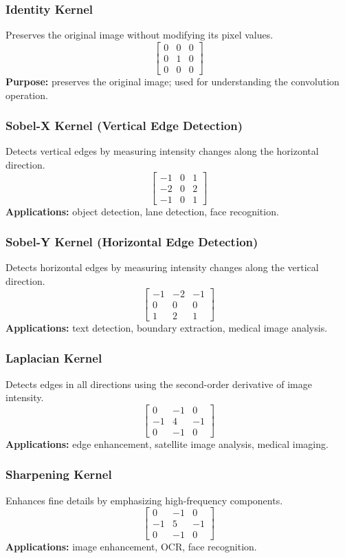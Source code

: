 \documentclass[11pt]{article}
\begin{document}
\subsubsection*{Identity Kernel}
Preserves the original image without modifying its pixel values.
\[
\begin{bmatrix}
0 & 0 & 0\\
0 & 1 & 0\\
0 & 0 & 0
\end{bmatrix}
\]
\textbf{Purpose:} preserves the original image; used for understanding the convolution operation.

\subsubsection*{Sobel-X Kernel (Vertical Edge Detection)}
Detects vertical edges by measuring intensity changes along the horizontal direction.
\[
\begin{bmatrix}
-1 & 0 & 1\\
-2 & 0 & 2\\
-1 & 0 & 1
\end{bmatrix}
\]
\textbf{Applications:} object detection, lane detection, face recognition.

\subsubsection*{Sobel-Y Kernel (Horizontal Edge Detection)}
Detects horizontal edges by measuring intensity changes along the vertical direction.
\[
\begin{bmatrix}
-1 & -2 & -1\\
0 & 0 & 0\\
1 & 2 & 1
\end{bmatrix}
\]
\textbf{Applications:} text detection, boundary extraction, medical image analysis.

\subsubsection*{Laplacian Kernel}
Detects edges in all directions using the second-order derivative of image intensity.
\[
\begin{bmatrix}
0 & -1 & 0\\
-1 & 4 & -1\\
0 & -1 & 0
\end{bmatrix}
\]
\textbf{Applications:} edge enhancement, satellite image analysis, medical imaging.

\subsubsection*{Sharpening Kernel}
Enhances fine details by emphasizing high-frequency components.
\[
\begin{bmatrix}
0 & -1 & 0\\
-1 & 5 & -1\\
0 & -1 & 0
\end{bmatrix}
\]
\textbf{Applications:} image enhancement, OCR, face recognition.
\end{document}

